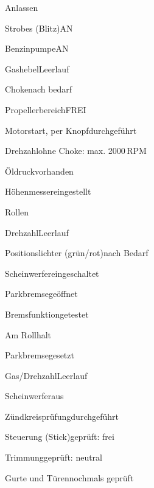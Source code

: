 \begin{checklist}{Anlassen}
	\item{Strobes (Blitz)}{AN}
	\item{Benzinpumpe}{AN}
	\item{Gashebel}{Leerlauf}
	\item{Choke}{nach bedarf}
	\item{Propellerbereich}{FREI}
	\item{Motorstart, per Knopf}{durchgeführt}
	\item{Drehzahl}{ohne Choke: max. 2000\,RPM}
	\item{Öldruck}{vorhanden}
	  \item{Höhenmesser}{eingestellt}
\end{checklist}

\begin{checklist}{Rollen}
	\item{Drehzahl}{Leerlauf}
	\item{Positionslichter (grün/rot)}{nach Bedarf}
	\item{Scheinwerfer}{eingeschaltet}
	\item{Parkbremse}{geöffnet}
	  \item{Bremsfunktion}{getestet}
\end{checklist}

\begin{checklist}{Am Rollhalt}
	\item{Parkbremse}{gesetzt}
	\item{Gas/Drehzahl}{Leerlauf}
	\item{Scheinwerfer}{aus}
	\item{Zündkreisprüfung}{durchgeführt}
	\item{Steuerung (Stick)}{geprüft: frei}
	\item{Trimmung}{geprüft: neutral}
	\item{Gurte und Türen}{nochmals geprüft}
\end{checklist}

